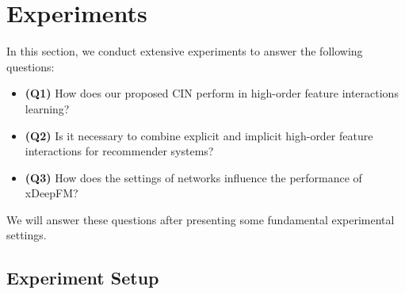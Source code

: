 \section{Experiments}\label{experiments}
In this section, we conduct extensive experiments to answer the following questions:
\begin{itemize}
    \item \textbf{(Q1)} How does our proposed CIN perform in high-order feature interactions learning?
    \item \textbf{(Q2)} Is it necessary to combine explicit and implicit high-order feature interactions for recommender systems?
    \item \textbf{(Q3)} How does the settings of networks influence the performance of xDeepFM?
\end{itemize}
We will answer these questions after presenting some fundamental experimental settings.
\subsection{Experiment Setup}
